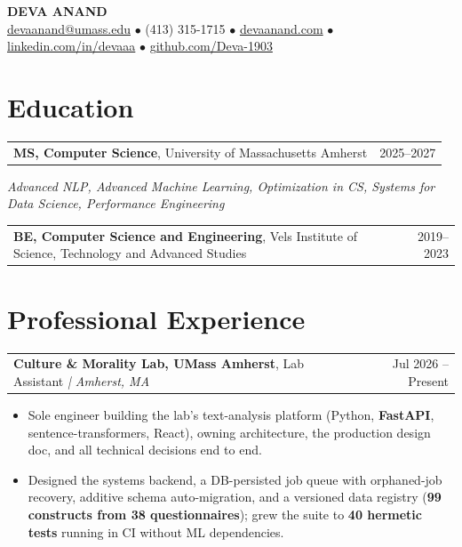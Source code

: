 \documentclass[letterpaper,11pt]{article}
\makeatletter
\newcommand{\eduItem}[3]{%
  \begin{tabular*}{\textwidth}{@{}l@{\extracolsep{\fill}}r@{}}
    \textbf{#1}, #2 & #3 \\
  \end{tabular*}\par
}
\newcommand{\expItem}[4]{%
  \vspace{2pt}
  \begin{tabular*}{\textwidth}{@{}l@{\extracolsep{\fill}}r@{}}
    \textbf{#1}, #2 \textit{| #3} & #4 \\
  \end{tabular*}\par\vspace{-3pt}
}
\makeatother
\begin{document}
\begin{center}
    {\fontsize{18}{20}\selectfont\bfseries DEVA ANAND}\\ \vspace{3pt}
    {\small
    \href{mailto:devaanand@umass.edu}{devaanand@umass.edu}
    \enspace$\bullet$\enspace
    (413) 315-1715
    \enspace$\bullet$\enspace
    \href{https://devaanand.com}{devaanand.com}
    \enspace$\bullet$\enspace
    \href{https://linkedin.com/in/devaaa/}{linkedin.com/in/devaaa}
    \enspace$\bullet$\enspace
    \href{https://github.com/Deva-1903}{github.com/Deva-1903}}
\end{center}
\vspace{-8pt}

\section{Education}
\eduItem{MS, Computer Science}{University of Massachusetts Amherst}{2025--2027}
{\small\textit{Advanced NLP, Advanced Machine Learning, Optimization in CS, Systems for Data Science, Performance Engineering}}\par
\vspace{3pt}
\eduItem{BE, Computer Science and Engineering}{Vels Institute of Science, Technology and Advanced Studies}{2019--2023}

\section{Professional Experience}

\expItem{Culture \& Morality Lab, UMass Amherst}{Lab Assistant}{Amherst, MA}{Jul 2026 -- Present}
\begin{itemize}
  \item Sole engineer building the lab's text-analysis platform (Python, \textbf{FastAPI}, sentence-transformers, React), owning architecture, the production design doc, and all technical decisions end to end.
  \item Designed the systems backend, a DB-persisted job queue with orphaned-job recovery, additive schema auto-migration, and a versioned data registry (\textbf{99 constructs from 38 questionnaires}); grew the suite to \textbf{40 hermetic tests} running in CI without ML dependencies.
\end{itemize}
\end{document}
